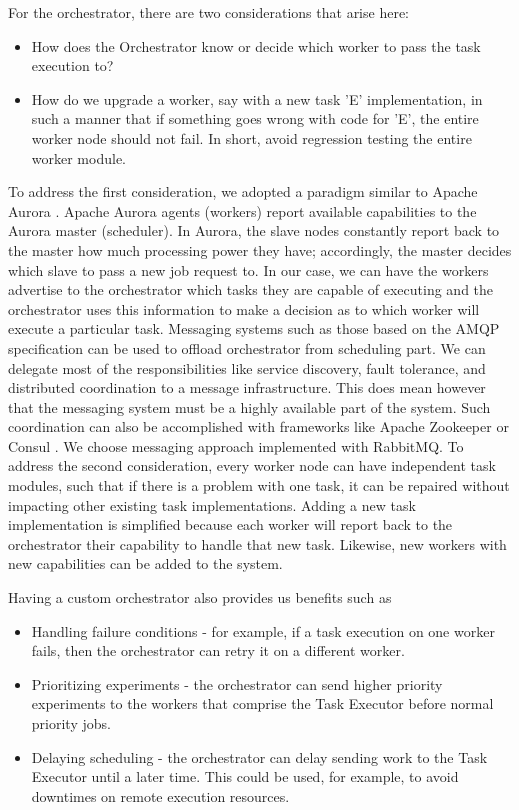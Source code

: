 \documentclass[review]{elsarticle}
\begin{document}
For the orchestrator, there are two considerations that arise here:
\begin{itemize}
\item How does the Orchestrator know or decide which worker to pass the task execution to?
\item How do we upgrade a worker, say with a new task 'E' implementation, in such a manner that if something goes wrong with code for 'E', the entire worker node should not fail. In short, avoid regression testing the entire worker module.
\end{itemize}

To address the first consideration, we adopted a paradigm similar to Apache Aurora \cite{apacheAurora}.  Apache Aurora agents (workers) report available capabilities to the Aurora master (scheduler). In Aurora, the slave nodes constantly report back to the master how much processing power they have; accordingly, the master decides which slave to pass a new job request to. In our case, we can have the workers advertise to the orchestrator which tasks they are capable of executing and the orchestrator uses this information to make a decision as to which worker will execute a particular task.
Messaging systems such as those based on the AMQP specification can be used to offload orchestrator from scheduling part. We can delegate most of the responsibilities like service discovery, fault tolerance, and distributed coordination to a message infrastructure. This does mean however that the messaging system must be a highly available part of the system. Such coordination can also be accomplished with  frameworks like Apache Zookeeper \cite{hunt2010zookeeper} or Consul \cite{vargo2016consul}. We choose messaging approach implemented with RabbitMQ. 
To address the second consideration, every worker node can have independent task modules, such that if there is a problem with one task, it can be repaired without impacting other existing task implementations. Adding a new task implementation is simplified because each worker will report back to the orchestrator their capability to handle that new task. Likewise, new workers with new capabilities can be added to the system.  

Having a custom orchestrator also provides us benefits such as
\begin{itemize}
\item Handling failure conditions - for example, if a task execution on one worker fails, then the orchestrator can retry it on a different worker.
\item Prioritizing experiments - the orchestrator can send higher priority experiments to the workers that comprise the Task Executor before normal priority jobs.  
\item Delaying scheduling - the orchestrator can delay sending work to the Task Executor until a later time.   This could be used, for example, to avoid downtimes on remote execution resources. 
\end{itemize}
\end{document}
